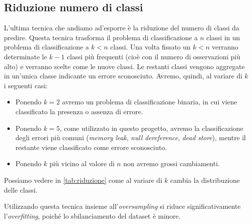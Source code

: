 \subsection{Riduzione numero di classi}
L'ultima tecnica che andiamo ad'esporre è la riduzione del numero di classi da predire.
Questa tecnica trasforma il problema di classificazione a $n$ classi in un problema di classificazione a $k<n$ classi.
Una volta fissato un $k < n$ verranno determinate le $k - 1$ classi più frequenti (cioè con il numero di osservazioni più alto) e verranno scelte come le nuove classi.
Le restanti classi vengono aggregate in un'unica classe indicante un errore sconosciuto. 
Avremo, quindi, al variare di $k$ i seguenti casi:
    \begin{itemize}
        \item Ponendo $k=2$ avremo un problema di classificazione binaria, in cui viene classificato la presenza o assenza di errore.
        \item Ponendo $k=5$, come utilizzato in questo progetto, avremo la classificazione degli errori più comuni (\textit{memory leak}, \textit{null dereference}, \textit{dead store}), mentre il restante viene classificato come errore sconosciuto.
        \item Ponendo $k$ più vicino al valore di $n$ non avremo grossi cambiamenti.
    \end{itemize}
Possiamo vedere in \autoref{tab:riduzione} come al variare di $k$ cambia la distribuzione delle classi.

Utilizzando questa tecnica insieme all'\textit{oversampling} si riduce significativamente l'\textit{overfitting}, poiché lo sbilanciamento del dataset è minore.

